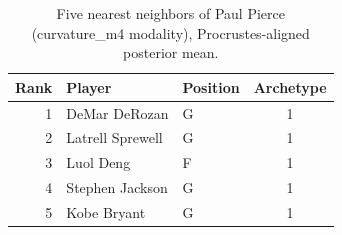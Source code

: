 \begin{table}[htbp]
  \centering\small
  \begin{tabular}{rllc}
    \toprule
    Rank & Player & Position & Archetype \\
    \midrule
    1 & DeMar DeRozan & G & 1 \\
    2 & Latrell Sprewell & G & 1 \\
    3 & Luol Deng & F & 1 \\
    4 & Stephen Jackson & G & 1 \\
    5 & Kobe Bryant & G & 1 \\
    \bottomrule
  \end{tabular}
  \caption{Five nearest neighbors of Paul Pierce (curvature_m4 modality), Procrustes-aligned posterior mean.}
  \label{tab:Paul_Pierce_neighbors_curvature_m4}
\end{table}

